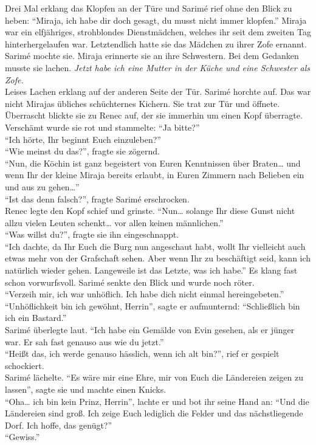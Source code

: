 Drei Mal erklang das Klopfen an der Türe und Sarimé rief ohne den Blick zu heben: ``Miraja, ich 
habe dir doch gesagt, du musst nicht immer klopfen.''
Miraja war ein elfjähriges, strohblondes Dienstmädchen, welches ihr seit dem zweiten Tag 
hinterhergelaufen war. Letztendlich hatte sie das Mädchen zu ihrer Zofe ernannt. Sarimé mochte sie. 
Miraja erinnerte sie an ihre Schwestern. Bei dem Gedanken musste sie lachen. \textit{Jetzt habe 
ich eine Mutter in der Küche und eine Schwester als Zofe.}\\
Leises Lachen erklang auf der anderen Seite der Tür. Sarimé horchte auf. Das war nicht 
Mirajas übliches schüchternes Kichern. Sie trat zur Tür und öffnete. Überrascht blickte sie zu 
Renec auf, der sie immerhin um einen Kopf überragte. Verschämt wurde sie rot und stammelte: ``Ja 
bitte?''\\
``Ich hörte, Ihr beginnt Euch einzuleben?''\\
``Wie meinst du das?'', fragte sie zögernd.\\
``Nun, die Köchin ist ganz begeistert von Euren Kenntnissen über Braten… und wenn Ihr der kleine 
Miraja bereits erlaubt, in Euren Zimmern nach Belieben ein und aus zu gehen…''\\
``Ist das denn falsch?'', fragte Sarimé erschrocken.\\
Renec legte den Kopf schief und grinste. ``Nun… solange Ihr diese Gunst nicht allzu vielen Leuten 
schenkt… vor allen keinen männlichen.''\\
``Was willst du?'', fragte sie ihn eingeschnappt.\\
``Ich dachte, da Ihr Euch die Burg nun angeschaut habt, wollt Ihr vielleicht auch etwas mehr von 
der Grafschaft sehen. Aber wenn Ihr zu beschäftigt seid, kann ich natürlich wieder gehen. 
Langeweile ist das Letzte, was ich habe.'' Es klang fast schon vorwurfsvoll. Sarimé senkte den Blick 
und wurde noch röter.\\ 
``Verzeih mir, ich war unhöflich. Ich habe dich nicht einmal hereingebeten.''\\
``Unhöflichkeit bin ich gewöhnt, Herrin'', sagte er aufmunternd: ``Schließlich bin ich ein 
Bastard.''\\
Sarimé überlegte laut. ``Ich habe ein Gemälde von Evin gesehen, als er jünger war. Er sah fast 
genauso aus wie du jetzt.''\\
``Heißt das, ich werde genauso hässlich, wenn ich alt bin?'', rief er gespielt schockiert.\\
Sarimé lächelte. ``Es wäre mir eine Ehre, mir von Euch die Ländereien zeigen zu lassen'', sagte sie 
und machte einen Knicks.\\
``Oha… ich bin kein Prinz, Herrin'', lachte er und bot ihr seine Hand an: ``Und die Ländereien sind 
groß. Ich zeige Euch lediglich die Felder und das nächstliegende Dorf. Ich hoffe, das genügt?''\\
``Gewiss.''\\

